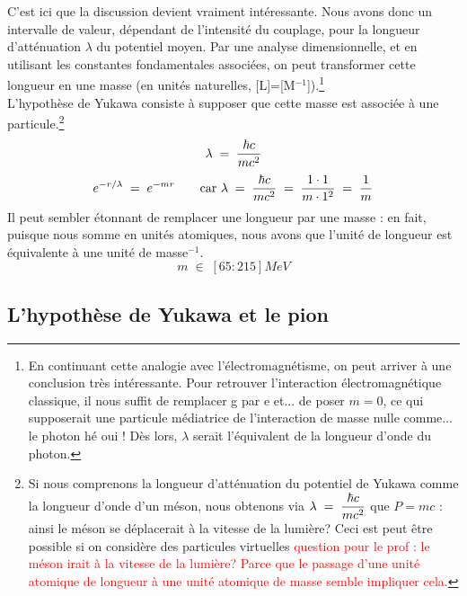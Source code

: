 C'est ici que la discussion devient vraiment intéressante. Nous avons donc un intervalle de valeur, dépendant de l'intensité du couplage, pour la longueur d'atténuation $\lambda$ du potentiel moyen. Par une analyse dimensionnelle, et en utilisant les constantes fondamentales associées, on peut transformer cette longueur en une masse (en unités naturelles, [L]=[M$^{-1}$]).\footnote{En continuant cette analogie avec l'électromagnétisme, on peut arriver à une conclusion très intéressante. Pour retrouver l'interaction électromagnétique classique, il nous suffit de remplacer g par e et... de poser $m = 0$, ce qui supposerait une particule médiatrice de l'interaction de masse nulle comme... le photon hé oui ! Dès lors, $\lambda$ serait l'équivalent de la longueur d'onde du photon.}\\
L'hypothèse de Yukawa consiste à supposer que cette masse est associée à une particule.\footnote{Si nous comprenons la longueur d'atténuation du potentiel de Yukawa comme la longueur d'onde d'un méson, nous obtenons via $\lambda \; = \; \dfrac{\hbar c}{mc^2}$ que $P=mc$ : ainsi le méson se déplacerait à la vitesse de la lumière? Ceci est peut être possible si on considère des particules virtuelles \textcolor{red}{question pour le prof : le méson irait à la vitesse de la lumière? Parce que le passage d'une unité atomique de longueur à une unité atomique de masse semble impliquer cela.}}\\
\[
    \lambda \; = \; \dfrac{\hbar c}{mc^2}
\]
\[
    e^{-r/\lambda} \; = \; e^{-mr} \qquad \text{car } \lambda \; = \; \dfrac{\hbar c}{mc^2} \; = \; \dfrac{1\cdot 1}{m \cdot 1^2} \; = \; \dfrac{1}{m}
\]
Il peut sembler étonnant de remplacer une longueur par une masse : en fait, puisque nous somme en unités atomiques, nous avons que l'unité de longueur est équivalente à une unité de masse$^{-1}$.
\[
    m\;\in\; [65:215]\si{MeV}
\]


\subsection{L'hypothèse de Yukawa et le pion}



